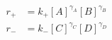 \begin{eqnarray}
r_+  & =  k_+[A]^{\gamma_A}[B]^{\gamma_B} \\
r_-  & =  k_-[C]^{\gamma_C}[D]^{\gamma_D} \\
\end{eqnarray}